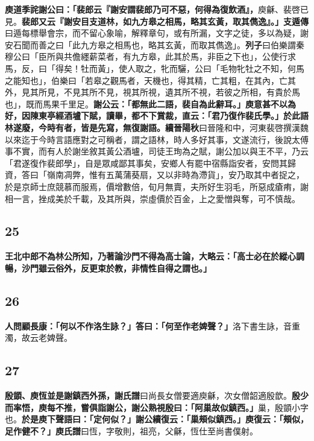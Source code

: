 \textbf{庾道季詫謝公曰：「裴郎云『謝安謂裴郎乃可不惡，何得為復飲酒』，}{\footnotesize 庾龢、裴啓已見。}\textbf{裴郎又云『謝安目支道林，如九方皋之相馬，略其玄黃，取其儁逸』。」}{\footnotesize \textbf{支遁傳}曰遁每標舉會宗，而不留心象喻，解釋章句，或有所漏，文字之徒，多以為疑，謝安石聞而善之曰「此九方皋之相馬也，略其玄黃，而取其儁逸」。\textbf{列子}曰伯樂謂秦穆公曰「臣所與共儋纆薪菜者，有九方皋，此其於馬，非臣之下也」，公使行求馬，反，曰「得矣！牡而黃」，使人取之，牝而驪，公曰「毛物牝牡之不知，何馬之能知也」，伯樂曰「若皋之觀馬者，天機也，得其精，亡其粗，在其內，亡其外，見其所見，不見其所不見，視其所視，遺其所不視，若彼之所相，有貴於馬也」，既而馬果千里足。}\textbf{謝公云：「都無此二語，裴自為此辭耳。」庾意甚不以為好，因陳東亭經酒壚下賦，讀畢，都不下賞裁，直云：「君乃復作裴氏學。」於此語林遂廢，今時有者，皆是先寫，無復謝語。}{\footnotesize \textbf{續晉陽秋}曰晉隆和中，河東裴啓撰漢魏以來迄于今時言語應對之可稱者，謂之語林，時人多好其事，文遂流行，後說太傅事不實，而有人於謝坐敘其黃公酒壚，司徒王珣為之賦，謝公加以與王不平，乃云「君遂復作裴郎學」，自是眾咸鄙其事矣，安鄉人有罷中宿縣詣安者，安問其歸資，答曰「嶺南凋弊，惟有五萬蒲葵扇，又以非時為滯貨」，安乃取其中者捉之，於是京師士庶競慕而服焉，價增數倍，旬月無賣，夫所好生羽毛，所惡成瘡痏，謝相一言，挫成美於千載，及其所與，崇虛價於百金，上之愛憎與奪，可不慎哉。}

\subsection*{25}

\textbf{王北中郎不為林公所知，乃著論沙門不得為高士論，大略云：「高士必在於縱心調暢，沙門雖云俗外，反更束於教，非情性自得之謂也。」}

\subsection*{26}

\textbf{人問顧長康：「何以不作洛生詠？」答曰：「何至作老婢聲？」}{\footnotesize 洛下書生詠，音重濁，故云老婢聲。}

\subsection*{27}

\textbf{殷顗、庾恆並是謝鎮西外孫，}{\footnotesize \textbf{謝氏譜}曰尚長女僧要適庾龢，次女僧韶適殷歆。}\textbf{殷少而率悟，庾每不推，嘗俱詣謝公，謝公熟視殷曰：「阿巢故似鎮西。」}{\footnotesize 巢，殷顗小字也。}\textbf{於是庾下聲語曰：「定何似？」謝公續復云：「巢頰似鎮西。」庾復云：「頰似，足作健不？」}{\footnotesize \textbf{庾氏譜}曰恆，字敬則，祖亮，父龢，恆仕至尚書僕射。}

